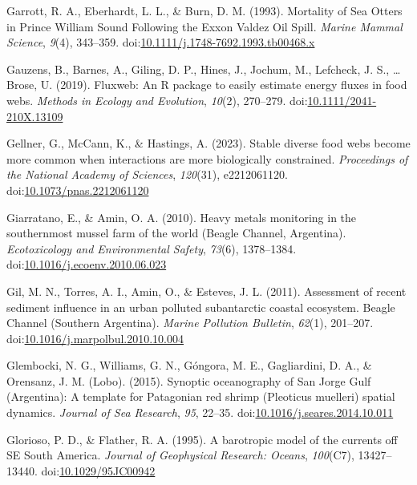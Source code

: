 \documentclass[
]{article}
\newlength{\cslhangindent}
\newlength{\cslentryspacingunit} %
\newenvironment{CSLReferences}[2] %
 {%
  \setlength{\parindent}{0pt}
  \ifodd #1
  \let\oldpar\par
  \def\par{\hangindent=\cslhangindent\oldpar}
  \fi
  \setlength{\parskip}{#2\cslentryspacingunit}
 }%
 {}
\begin{document}
\begin{CSLReferences}{1}{0}
\leavevmode{}%
Garrott, R. A., Eberhardt, L. L., \& Burn, D. M. (1993). Mortality of
{Sea Otters} in {Prince William Sound Following} the {Exxon Valdez Oil
Spill}. \emph{Marine Mammal Science}, \emph{9}(4), 343--359.
doi:\href{https://doi.org/10.1111/j.1748-7692.1993.tb00468.x}{10.1111/j.1748-7692.1993.tb00468.x}

\leavevmode{}%
Gauzens, B., Barnes, A., Giling, D. P., Hines, J., Jochum, M., Lefcheck,
J. S., \ldots{} Brose, U. (2019). Fluxweb: {An R} package to easily
estimate energy fluxes in food webs. \emph{Methods in Ecology and
Evolution}, \emph{10}(2), 270--279.
doi:\href{https://doi.org/10.1111/2041-210X.13109}{10.1111/2041-210X.13109}

\leavevmode{}%
Gellner, G., McCann, K., \& Hastings, A. (2023). Stable diverse food
webs become more common when interactions are more biologically
constrained. \emph{Proceedings of the National Academy of Sciences},
\emph{120}(31), e2212061120.
doi:\href{https://doi.org/10.1073/pnas.2212061120}{10.1073/pnas.2212061120}

\leavevmode{}%
Giarratano, E., \& Amin, O. A. (2010). Heavy metals monitoring in the
southernmost mussel farm of the world ({Beagle Channel}, {Argentina}).
\emph{Ecotoxicology and Environmental Safety}, \emph{73}(6), 1378--1384.
doi:\href{https://doi.org/10.1016/j.ecoenv.2010.06.023}{10.1016/j.ecoenv.2010.06.023}

\leavevmode{}%
Gil, M. N., Torres, A. I., Amin, O., \& Esteves, J. L. (2011).
Assessment of recent sediment influence in an urban polluted
subantarctic coastal ecosystem. {Beagle Channel} ({Southern Argentina}).
\emph{Marine Pollution Bulletin}, \emph{62}(1), 201--207.
doi:\href{https://doi.org/10.1016/j.marpolbul.2010.10.004}{10.1016/j.marpolbul.2010.10.004}

\leavevmode{}%
Glembocki, N. G., Williams, G. N., Góngora, M. E., Gagliardini, D. A.,
\& Orensanz, J. M. (Lobo). (2015). Synoptic oceanography of {San Jorge
Gulf} ({Argentina}): {A} template for {Patagonian} red shrimp
({Pleoticus} muelleri) spatial dynamics. \emph{Journal of Sea Research},
\emph{95}, 22--35.
doi:\href{https://doi.org/10.1016/j.seares.2014.10.011}{10.1016/j.seares.2014.10.011}

\leavevmode{}%
Glorioso, P. D., \& Flather, R. A. (1995). A barotropic model of the
currents off {SE South America}. \emph{Journal of Geophysical Research:
Oceans}, \emph{100}(C7), 13427--13440.
doi:\href{https://doi.org/10.1029/95JC00942}{10.1029/95JC00942}


\end{CSLReferences}
\end{document}
